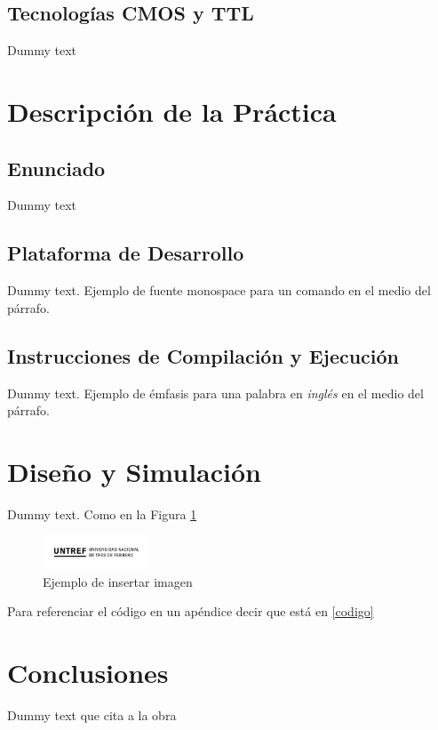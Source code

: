 \documentclass{article}
\begin{document}
\subsection*{Tecnologías CMOS y TTL}
Dummy text

\section*{Descripción de la Práctica}

\subsection*{Enunciado}
Dummy text

\subsection*{Plataforma de Desarrollo}
Dummy text. Ejemplo de fuente monospace {\ttfamily para un comando} en el medio del párrafo.

\subsection*{Instrucciones de Compilación y Ejecución}
Dummy text. Ejemplo de émfasis para una palabra en \textit{inglés} en el medio del párrafo.

\section*{Diseño y Simulación}
Dummy text. Como en la Figura \ref{imagen}

\begin{figure}[h]
    \centering
    \includegraphics[height=1cm]{logo.png}
    \caption{Ejemplo de insertar imagen}
    \label{imagen}
\end{figure}

Para referenciar el código en un apéndice decir que está en \ref{codigo}

\section*{Conclusiones}
Dummy text que cita a la obra \cite{boylestad}
\end{document}
